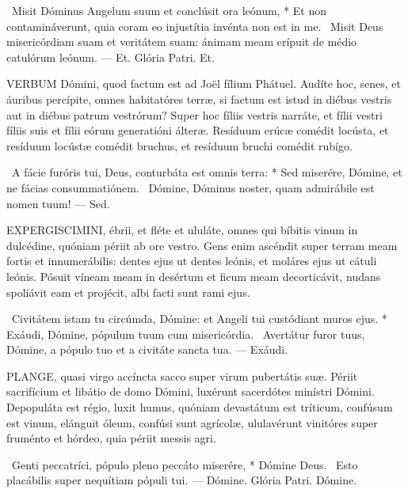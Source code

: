 \R\ Misit Dóminus Angelum suum et conclúsit ora leónum, * Et non contamináverunt, quia coram eo injustítia invénta non est in me. \V\ Misit Deus misericórdiam suam et veritátem suam: ánimam meam erípuit de médio catulórum leónum. — Et. Glória Patri. Et.




\lettrine[lines=2]{V}{ERBUM} Dómini, quod factum est ad Joël fílium Phátuel. Audíte hoc, senes, et áuribus percípite, omnes habitatóres terræ, si factum est istud in diébus vestris aut in diébus patrum vestrórum? Super hoc fíliis vestris narráte, et fílii vestri fíliis suis et fílii eórum generatióni álteræ. Resíduum erúcæ comédit locústa, et resíduum locústæ comédit bruchus, et resíduum bruchi comédit rubígo.

\R\ A fácie furóris tui, Deus, conturbáta est omnis terra: * Sed miserére, Dómine, et ne fácias consummatiónem. \V\ Dómine, Dóminus noster, quam admirábile est nomen tuum! — Sed.


\lettrine[lines=2]{E}{XPERGISCIMINI}, ébrii, et fléte et ululáte, omnes qui bíbitis vinum in dulcédine, quóniam périit ab ore vestro. Gens enim ascéndit super terram meam fortis et innumerábilis: dentes ejus ut dentes leónis, et moláres ejus ut cátuli leónis. Pósuit víneam meam in desértum et ficum meam decorticávit, nudans spoliávit eam et projécit, albi facti sunt rami ejus.

\R\ Civitátem istam tu circúmda, Dómine: et Angeli tui custódiant muros ejus. * Exáudi, Dómine, pópulum tuum cum misericórdia. \V\ Avertátur furor tuus, Dómine, a pópulo tuo et a civitáte sancta tua. — Exáudi.



\lettrine[lines=2]{P}{LANGE}, quasi virgo accíncta sacco super virum pubertátis suæ. Périit sacrifícium et libátio de domo Dómini, luxérunt sacerdótes minístri Dómini. Depopuláta est régio, luxit humus, quóniam devastátum est tríticum, confúsum est vinum, elánguit óleum, confúsi sunt agrícolæ, ululavérunt vinitóres super fruménto et hórdeo, quia périit messis agri.

\R\ Genti peccatríci, pópulo pleno peccáto miserére, * Dómine Deus. \V\ Esto placábilis super nequítiam pópuli tui. — Dómine. Glória Patri. Dómine.

